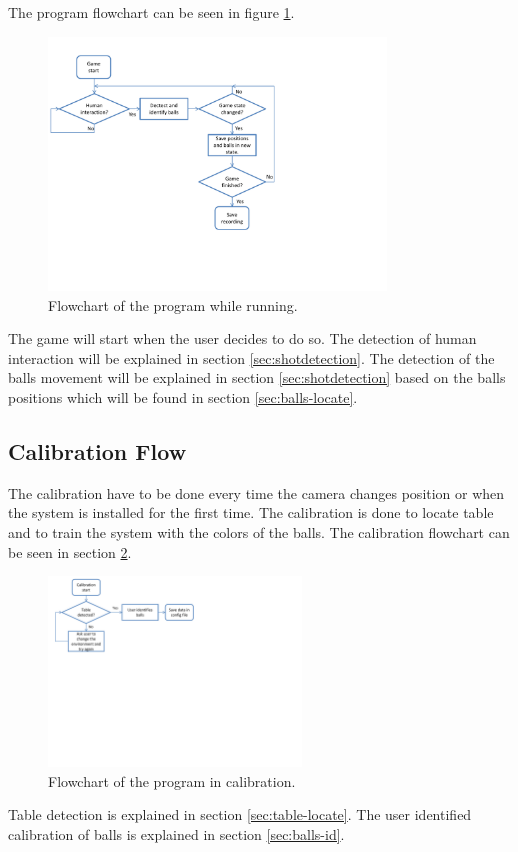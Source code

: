 The program flowchart can be seen in figure \ref{fig:program_flowchart}.

\begin{figure}[htpb]
\begin{center}
\leavevmode
\includegraphics[width=0.8\textwidth]{images/program_flowchart}
\end{center}
\caption{Flowchart of the program while running.}
\label{fig:program_flowchart}
\end{figure}

The game will start when the user decides to do so. The detection of human interaction will be explained in section \ref{sec:shotdetection}. The detection of the balls movement will be explained in section \ref{sec:shotdetection} based on the balls positions which will be found in section \ref{sec:balls-locate}.

\subsection{Calibration Flow}
The calibration have to be done every time the camera changes position or when the system is installed for the first time. The calibration is done to locate table and to train the system with the colors of the balls. The calibration flowchart can be seen in section \ref{fig:calib_flowchart}.

\begin{figure}[htpb]
\begin{center}
\leavevmode
\includegraphics[width=0.6\textwidth]{images/calib_flowchart}
\end{center}
\caption{Flowchart of the program in calibration.}
\label{fig:calib_flowchart}
\end{figure}

Table detection is explained in section \ref{sec:table-locate}. The user identified calibration of balls is explained in section \ref{sec:balls-id}.